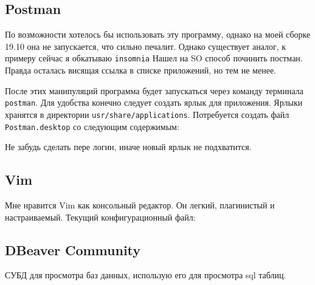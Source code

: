 \documentclass[a4paper, 12pt]{report}
\begin{document}
\subsection{Postman} По возможности хотелось бы использовать эту программу, однако на моей сборке 19.10 она не запускается, что сильно печалит. Однако существует аналог, к примеру сейчас я обкатываю \lstinline|insomnia|
Нашел на SO способ починить постман. Правда осталась висящая ссылка в списке приложений, но тем не менее.

После этих манипуляций программа будет запускаться через команду терминала \lstinline|postman|. Для удобства конечно следует создать ярлык для приложения.
Ярлыки хранятся в директории \lstinline|usr/share/applications|. Потребуется создать файл \lstinline|Postman.desktop| со следующим содержимым:

Не забудь сделать пере логин, иначе новый ярлык не подхватится.
\subsection{Vim} Мне нравится Vim как консольный редактор. Он легкий, плагинистый и настраиваемый. Текущий конфигурационный файл:

\subsection{DBeaver Community} СУБД для просмотра баз данных, использую его для просмотра sql таблиц.
\end{document}
